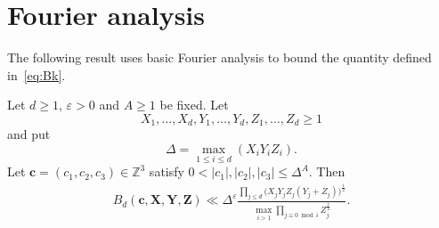 \section{Fourier analysis}\label{s:fourier}

The following result uses basic Fourier analysis to bound the
quantity
defined in~\eqref{eq:Bk}.

\begin{proposition}\label{prop:FourierAnalysis}
  Let $d\geq 1$, $\varepsilon>0$ and $A\geq 1$ be fixed.
  Let \[
  X_1,\ldots, X_d, Y_1,\ldots, Y_d,Z_1,\ldots, Z_d\geq 1
  \]
  and put
  \begin{equation}\label{eq:Delta}
  \Delta =\max_{1\leq i\leq d}(X_i Y_i Z_i).
  \end{equation}
  Let $\mathbf{c}=(c_1,c_2,c_3)\in \mathbb{Z}^3$ satisfy $0<|c_1|,|c_2|,|c_3|\leq \Delta^A$.
  Then
  \begin{align*}
  B_d(\mathbf{c},\mathbf{X},\mathbf{Y},\mathbf{Z}) \ll
  \Delta^\varepsilon \frac{\prod_{j\leq d} \big(X_j Y_j Z_j(Y_j+Z_j)\big)^{\frac{1}{2}}}{\max_{i>1}\prod_{j\equiv 0\bmod i}Z_j^{\frac{1}{2}}}.
  \end{align*}
\end{proposition}

